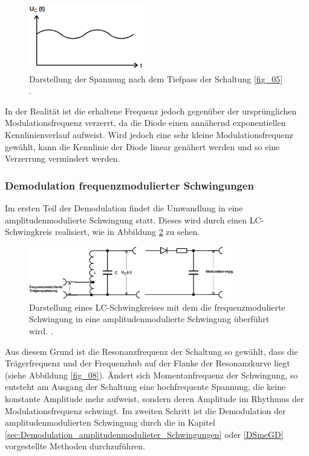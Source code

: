 \begin{figure}
    \centering
    \includegraphics[width=0.45\textwidth]{ressources/A7.png}
    \caption{Darstellung der Spannung nach dem Tiefpass der Schaltung \ref{fig_05} \cite{skript}.}
    \label{fig_07}
\end{figure}

In der Realität ist die erhaltene Frequenz jedoch gegenüber der ursprünglichen Modulationsfrequenz verzerrt, da die Diode einen annähernd exponentiellen Kennlinienverlauf aufweist. Wird jedoch eine sehr kleine Modulationsfrequenz gewählt, kann die Kennlinie der Diode linear genähert werden und so eine Verzerrung vermindert werden.

\subsubsection{Demodulation frequenzmodulierter Schwingungen}
\label{sec:Demodulation_frequenzmodulieter_Schwingungen}
Im ersten Teil der Demodulation findet die Umwandlung in eine amplitudenmodulierte Schwingung statt. Dieses wird durch einen LC-Schwingkreis realisiert, wie in Abbildung \ref{fig_12} zu sehen. 

\begin{figure}
    \centering
    \includegraphics[width=0.80\textwidth]{ressources/A12.png}
    \caption{Darstellung eines LC-Schwingkreises mit dem die frequenzmodulierte Schwingung in eine amplitudenmodulierte Schwingung überführt wird. \cite{skript}.}
    \label{fig_12}
\end{figure}


Aus diesem Grund ist die Resonanzfrequenz der Schaltung so gewählt, dass die Trägerfrequenz und der Frequenzhub auf der Flanke der Resonanzkurve liegt (siehe Abbildung \ref{fig_08}). Ändert sich Momentanfrequenz der Schwingung, so entsteht am Ausgang der Schaltung eine hochfrequente Spannung, die keine konstante Amplitude mehr aufweist, sondern deren Amplitude im Rhythmus der Modulationsfrequenz schwingt. Im zweiten Schritt ist die Demodulation der amplitudenmodulierten Schwingung durch die in Kapitel \ref{sec:Demodulation_amplitudenmodulieter_Schwingungen} oder \ref{DSmeGD} vorgestellte Methoden durchzuführen. 

